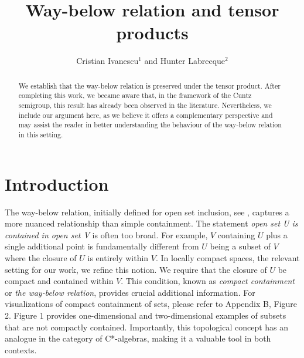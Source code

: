 \documentclass{iopconfser}
\theoremstyle{definition}
\begin{document}
\title{Way-below relation and tensor products}

\author{Cristian Ivanescu$^{1}$ and Hunter Labrecque$^{2}$}



\begin{abstract}
We establish that the way-below relation is preserved under the tensor product. After completing this work, we became aware that, in the framework of the Cuntz semigroup, this result has already been observed in the literature. Nevertheless, we include our argument here, as we believe it offers a complementary perspective and may assist the reader in better understanding the behaviour of the way-below relation in this setting.

\end{abstract}

\section{Introduction} 

 The way-below relation, initially defined for open set inclusion, see \cite{Scott}, captures a more nuanced relationship than simple containment.  The statement \textit{open set U is contained in open set V} is often too broad.  For example, $V$ containing $U$ plus a single additional point is fundamentally different from $U$ being a subset of $V$ where the closure of $U$ is entirely within $V$.  In locally compact spaces, the relevant setting for our work, we refine this notion.  We require that the closure of $U$ be compact and contained within $V$. This condition, known as \textit{compact containment} or \textit{the way-below relation}, provides crucial additional information. For visualizations of compact containment of sets, please refer to Appendix B, Figure 2. Figure 1 provides one-dimensional and two-dimensional examples of subsets that are not compactly contained. Importantly, this topological concept has an analogue in the category of C*-algebras, making it a valuable tool in both contexts.\\
 
\end{document}
